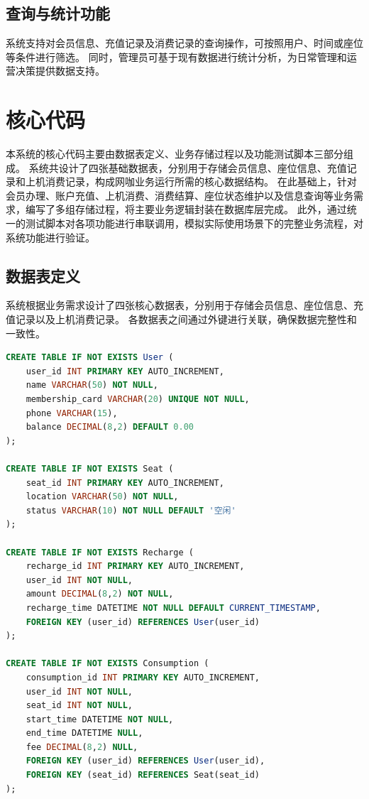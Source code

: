 \documentclass[12pt,a4paper]{article}
\begin{document}
\subsection{查询与统计功能}
系统支持对会员信息、充值记录及消费记录的查询操作，可按照用户、时间或座位等条件进行筛选。
同时，管理员可基于现有数据进行统计分析，为日常管理和运营决策提供数据支持。

\section{核心代码}
本系统的核心代码主要由数据表定义、业务存储过程以及功能测试脚本三部分组成。
系统共设计了四张基础数据表，分别用于存储会员信息、座位信息、充值记录和上机消费记录，构成网咖业务运行所需的核心数据结构。
在此基础上，针对会员办理、账户充值、上机消费、消费结算、座位状态维护以及信息查询等业务需求，编写了多组存储过程，将主要业务逻辑封装在数据库层完成。
此外，通过统一的测试脚本对各项功能进行串联调用，模拟实际使用场景下的完整业务流程，对系统功能进行验证。

\subsection{数据表定义}
系统根据业务需求设计了四张核心数据表，分别用于存储会员信息、座位信息、充值记录以及上机消费记录。
各数据表之间通过外键进行关联，确保数据完整性和一致性。
\begin{lstlisting}[language=SQL,caption={系统核心数据表定义}]
CREATE TABLE IF NOT EXISTS User (
    user_id INT PRIMARY KEY AUTO_INCREMENT,
    name VARCHAR(50) NOT NULL,
    membership_card VARCHAR(20) UNIQUE NOT NULL,
    phone VARCHAR(15),
    balance DECIMAL(8,2) DEFAULT 0.00
);

CREATE TABLE IF NOT EXISTS Seat (
    seat_id INT PRIMARY KEY AUTO_INCREMENT,
    location VARCHAR(50) NOT NULL,
    status VARCHAR(10) NOT NULL DEFAULT '空闲'
);

CREATE TABLE IF NOT EXISTS Recharge (
    recharge_id INT PRIMARY KEY AUTO_INCREMENT,
    user_id INT NOT NULL,
    amount DECIMAL(8,2) NOT NULL,
    recharge_time DATETIME NOT NULL DEFAULT CURRENT_TIMESTAMP,
    FOREIGN KEY (user_id) REFERENCES User(user_id)
);

CREATE TABLE IF NOT EXISTS Consumption (
    consumption_id INT PRIMARY KEY AUTO_INCREMENT,
    user_id INT NOT NULL,
    seat_id INT NOT NULL,
    start_time DATETIME NOT NULL,
    end_time DATETIME NULL,
    fee DECIMAL(8,2) NULL,
    FOREIGN KEY (user_id) REFERENCES User(user_id),
    FOREIGN KEY (seat_id) REFERENCES Seat(seat_id)
);
\end{lstlisting}
\end{document}
